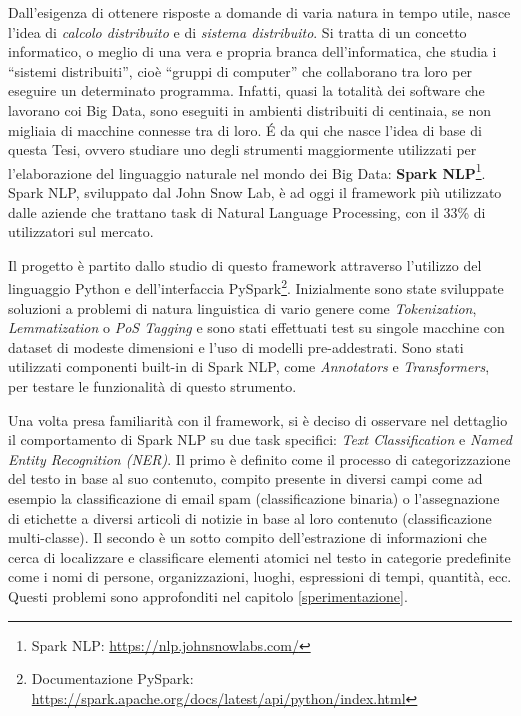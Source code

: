 Dall'esigenza di ottenere risposte a domande di varia natura in tempo utile, nasce l'idea di \textit{calcolo distribuito} e di \textit{sistema distribuito}. Si tratta di un concetto informatico, o meglio di una vera e propria branca dell’informatica, che studia i “sistemi distribuiti”, cioè “gruppi di computer” che collaborano tra loro per eseguire un determinato programma. Infatti, quasi la totalità dei software che lavorano coi Big Data, sono eseguiti in ambienti distribuiti di centinaia, se non migliaia di macchine connesse tra di loro. É da qui che nasce l'idea di base di questa Tesi, ovvero studiare uno degli strumenti maggiormente utilizzati per l'elaborazione del linguaggio naturale nel mondo dei Big Data: \textbf{Spark NLP}\footnote{Spark NLP: \href{https://nlp.johnsnowlabs.com/}{https://nlp.johnsnowlabs.com/}}. Spark NLP, sviluppato dal John Snow Lab, è ad oggi il framework più utilizzato dalle aziende che trattano task di Natural Language Processing, con il 33\% di utilizzatori sul mercato. 

Il progetto è partito dallo studio di questo framework attraverso l'utilizzo del linguaggio Python e dell'interfaccia PySpark\footnote{Documentazione PySpark: \href{https://spark.apache.org/docs/latest/api/python/index.html}{https://spark.apache.org/docs/latest/api/python/index.html}}. Inizialmente sono state sviluppate soluzioni a problemi di natura linguistica di vario genere come \textit{Tokenization}, \textit{Lemmatization} o \textit{PoS Tagging} e sono stati effettuati test su singole macchine con dataset di modeste dimensioni e l'uso di modelli pre-addestrati.
Sono stati utilizzati componenti built-in di Spark NLP, come \textit{Annotators} e \textit{Transformers}, per testare le funzionalità di questo strumento.

Una volta presa familiarità con il framework, si è deciso di osservare nel dettaglio il comportamento di Spark NLP su due task specifici: \textit{Text Classification} e \textit{Named Entity Recognition (NER)}. Il primo è definito come il processo di categorizzazione del testo in base al suo contenuto, compito presente in diversi campi come ad esempio la classificazione di email spam (classificazione binaria) o l'assegnazione di etichette a diversi articoli di notizie in base al loro contenuto (classificazione multi-classe). Il secondo è un sotto compito dell'estrazione di informazioni che cerca di localizzare e classificare elementi atomici nel testo in categorie predefinite come i nomi di persone, organizzazioni, luoghi, espressioni di tempi, quantità, ecc. Questi problemi sono approfonditi nel capitolo \ref{sperimentazione}.

